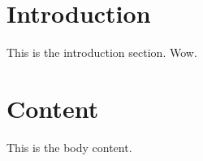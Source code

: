 \documentclass[11pt]{article}
\begin{document}
\pagestyle{empty} 
\setlength{\baselineskip}{12.6pt} %

\section{Introduction}
This is the introduction section. Wow. \cite{matthis2018}

\section{Content}
This is the body content.

\newpage


\end{document}

